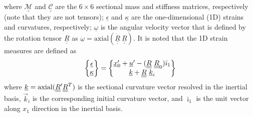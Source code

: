 where $\underline{\underline{\mathcal{M}}}$ and
$\underline{\underline{\mathcal{C}}}$ are the $6 \times 6$ sectional mass
and stiffness matrices, respectively (note that they are not tensors);
$\underline{\epsilon}$ and $\underline{\kappa}$ are the one-dimensional (1D) strains and
curvatures, respectively; $\underline{\omega}$ is the angular velocity
vector that is defined by the rotation tensor $\underline{\underline{R}}$ as
$\underline{\omega} = \mathrm{axial}(\dot{\underline{\underline{R}}}~\underline{\underline{R}})$. It is noted that the 1D strain measures are defined as
\begin{equation}
    \label{1DStrain}
    \begin{Bmatrix}
        \underline{\epsilon} \\
        \underline{\kappa}
    \end{Bmatrix}
    =
    \begin{Bmatrix}
        \underline{x}^\prime_0 + \underline{u}^\prime - (\underline{\underline{R}} ~\underline{\underline{R}}_0) \bar{\imath}_1 \\
        \underline{k} + \underline{\underline{R}}~ \underline{k}_i
    \end{Bmatrix}
\end{equation}
where $\underline{k} = \text{axial} (\underline{\underline{R}}^\prime \underline{\underline{R}}^T)$ is the sectional curvature vector resolved in the inertial basis, $\vec{k}_i$ is the corresponding initial curvature vector, and $\bar{\imath}_1$ is the unit vector along $x_1$ direction in the inertial basis. 

